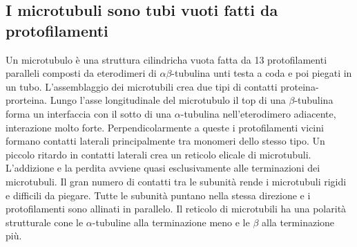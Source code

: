 \subsection{I microtubuli sono tubi vuoti fatti da protofilamenti}
Un microtubulo \`e una struttura cilindricha vuota fatta da 13 protofilamenti paralleli composti da eterodimeri di $\alpha\beta$-tubulina unti testa a coda e poi piegati in un tubo. 
L'assemblaggio dei microtubili crea due tipi di contatti proteina-prorteina. Lungo l'asse longitudinale del microtubulo il top di una $\beta$-tubulina forma un interfaccia con il sotto
di una $\alpha$-tubulina nell'eterodimero adiacente, interazione molto forte. Perpendicolarmente a queste i protofilamenti vicini formano contatti laterali principalmente tra monomeri
dello stesso tipo. Un piccolo ritardo in contatti laterali crea un reticolo elicale di microtubuli. L'addizione e la perdita avviene quasi esclusivamente alle terminazioni dei 
microtubuli. Il gran numero di contatti tra le subunit\`a rende i microtubuli rigidi e difficili da piegare. Tutte le subunit\`a puntano nella stessa direzione e i protofilamenti sono
allinati in parallelo. Il reticolo di microtubili ha una polarit\`a strutturale cone le $\alpha$-tubuline alla terminazione meno e le $\beta$ alla terminazione pi\`u. 
